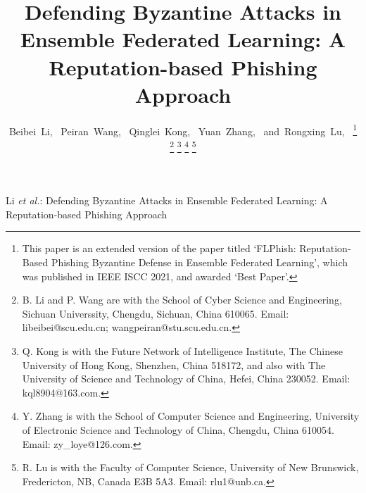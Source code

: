 \documentclass[journal]{IEEEtran}
\begin{document}
\title{Defending Byzantine Attacks in Ensemble Federated Learning: A Reputation-based Phishing Approach}
\author{Beibei~Li,~
        Peiran~Wang,~
        Qinglei~Kong,~
        Yuan~Zhang,~
        and~Rongxing~Lu,~
\thanks{This paper is an extended version of the paper titled `FLPhish: Reputation-Based Phishing Byzantine Defense in Ensemble Federated Learning', which was published in IEEE ISCC 2021, and awarded `Best Paper'.}
\thanks{B. Li and P. Wang are with the School of Cyber Science and Engineering, Sichuan Universsity, Chengdu, Sichuan, China 610065. Email: libeibei@scu.edu.cn; wangpeiran@stu.scu.edu.cn.}
\thanks{Q. Kong is with the Future Network of Intelligence Institute, The Chinese University of Hong Kong, Shenzhen, China 518172, and also with The University of Science and Technology of China, Hefei, China 230052. Email: kql8904@163.com.}
\thanks{Y. Zhang is with the School of Computer Science and Engineering, University of Electronic Science and Technology of China, Chengdu, China 610054. Email: zy\_loye@126.com.}
\thanks{R. Lu is with the Faculty of Computer Science, University of New Brunswick, Fredericton, NB, Canada E3B 5A3. Email: rlu1@unb.ca.}
}

%
{Li \MakeLowercase{\textit{et al.}}: Defending Byzantine Attacks in Ensemble Federated Learning: A Reputation-based Phishing Approach}


\maketitle
\end{document}
